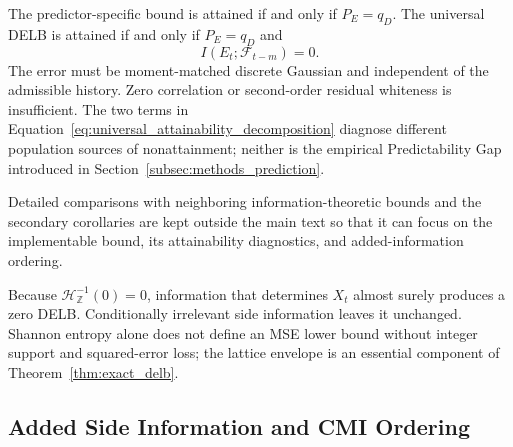 The predictor-specific bound is attained if and only if \(P_E=q_D\).
The universal DELB is attained if and only if \(P_E=q_D\) and
\begin{equation}
I(E_t;\mathcal F_{t-m})=0.
\label{eq:general_innovation_independence}
\end{equation}
The error must be moment-matched discrete Gaussian and independent of the
admissible history. Zero correlation or second-order residual
whiteness is insufficient. The two terms in
Equation~\eqref{eq:universal_attainability_decomposition} diagnose different
population sources of nonattainment; neither is the empirical
Predictability Gap introduced in Section~\ref{subsec:methods_prediction}.

Detailed comparisons with neighboring information-theoretic bounds and the
secondary corollaries are kept outside the main text so that it can focus on
the implementable bound, its attainability diagnostics, and added-information
ordering.

\begin{Remark}
\label{rem:general_boundary_cases}
Because \(\mathcal H_{\mathbb Z}^{-1}(0)=0\), information that determines
\(X_t\) almost surely produces a zero DELB. Conditionally irrelevant side
information leaves it unchanged. Shannon entropy alone does not define an
MSE lower bound without integer support and squared-error loss; the lattice
envelope is an essential component of Theorem~\ref{thm:exact_delb}.
\label{rem:support_and_loss}
\end{Remark}

\subsection{Added Side Information and CMI Ordering}
\label{subsec:side_information}

